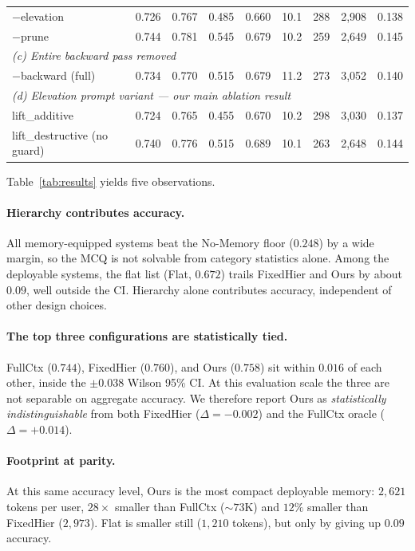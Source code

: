 \documentclass[sigconf,review,anonymous]{acmart}
\begin{document}
\begin{table}[!t]
\begin{tabular}{lcccccccc}
\quad\quad $-$elevation                     & 0.726 & 0.767 & 0.485 & 0.660 & 10.1 & 288 & 2{,}908 & 0.138 \\
\quad\quad $-$prune                         & 0.744 & 0.781 & 0.545 & 0.679 & 10.2 & 259 & 2{,}649 & 0.145 \\
\multicolumn{9}{l}{\quad\emph{(c) Entire backward pass removed}} \\
\quad\quad $-$backward (full)               & 0.734 & 0.770 & 0.515 & 0.679 & 11.2 & 273 & 3{,}052 & 0.140 \\
\multicolumn{9}{l}{\quad\emph{(d) Elevation prompt variant --- our main ablation result}} \\
\quad\quad lift\_additive                   & 0.724 & 0.765 & 0.455 & 0.670 & 10.2 & 298 & 3{,}030 & 0.137 \\
\quad\quad lift\_destructive (no guard)     & 0.740 & 0.776 & 0.515 & 0.689 & 10.1 & 263 & 2{,}648 & 0.144 \\
\bottomrule
\end{tabular}
\end{table}

Table~\ref{tab:results} yields five observations.

\paragraph{Hierarchy contributes accuracy.}
All memory-equipped systems beat the No-Memory floor (\(0.248\)) by a wide margin, so the MCQ is not solvable from category statistics alone. Among the deployable systems, the flat list (Flat, \(0.672\)) trails FixedHier and Ours by about \(0.09\), well outside the CI. Hierarchy alone contributes accuracy, independent of other design choices.

\paragraph{The top three configurations are statistically tied.}
FullCtx (\(0.744\)), FixedHier (\(0.760\)), and Ours (\(0.758\)) sit within \(0.016\) of each other, inside the \(\pm 0.038\) Wilson 95\% CI. At this evaluation scale the three are not separable on aggregate accuracy. We therefore report Ours as \emph{statistically indistinguishable} from both FixedHier (\(\Delta{=}{-}0.002\)) and the FullCtx oracle (\(\Delta{=}{+}0.014\)).

\paragraph{Footprint at parity.}
At this same accuracy level, Ours is the most compact deployable memory: \(2{,}621\) tokens per user, \(28\times\) smaller than FullCtx (\(\sim\!73\)K) and \(12\%\) smaller than FixedHier (\(2{,}973\)). Flat is smaller still (\(1{,}210\) tokens), but only by giving up \(0.09\) accuracy.
\end{document}

